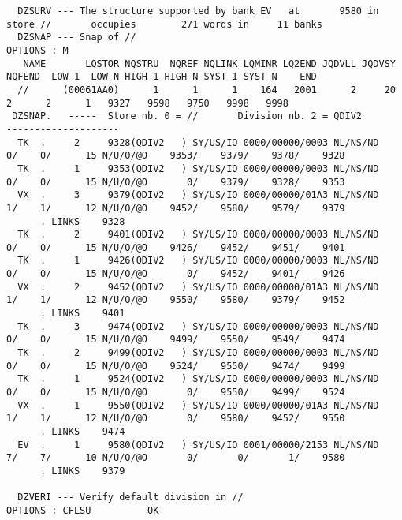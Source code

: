 \begin{Listing}
\begin{verbatim}
  DZSURV --- The structure supported by bank EV   at       9580 in store //       occupies        271 words in     11 banks
  DZSNAP --- Snap of //                                                                              OPTIONS : M
   NAME       LQSTOR NQSTRU  NQREF NQLINK LQMINR LQ2END JQDVLL JQDVSY NQFEND  LOW-1  LOW-N HIGH-1 HIGH-N SYST-1 SYST-N    END
  //      (00061AA0)      1      1      1    164   2001      2     20      2      2      1   9327   9598   9750   9998   9998
 DZSNAP.   -----  Store nb. 0 = //       Division nb. 2 = QDIV2                       --------------------
  TK  .     2     9328(QDIV2   ) SY/US/IO 0000/00000/0003 NL/NS/ND    0/    0/      15 N/U/O/@O    9353/    9379/    9378/    9328
  TK  .     1     9353(QDIV2   ) SY/US/IO 0000/00000/0003 NL/NS/ND    0/    0/      15 N/U/O/@O       0/    9379/    9328/    9353
  VX  .     3     9379(QDIV2   ) SY/US/IO 0000/00000/01A3 NL/NS/ND    1/    1/      12 N/U/O/@O    9452/    9580/    9579/    9379
      . LINKS    9328
  TK  .     2     9401(QDIV2   ) SY/US/IO 0000/00000/0003 NL/NS/ND    0/    0/      15 N/U/O/@O    9426/    9452/    9451/    9401
  TK  .     1     9426(QDIV2   ) SY/US/IO 0000/00000/0003 NL/NS/ND    0/    0/      15 N/U/O/@O       0/    9452/    9401/    9426
  VX  .     2     9452(QDIV2   ) SY/US/IO 0000/00000/01A3 NL/NS/ND    1/    1/      12 N/U/O/@O    9550/    9580/    9379/    9452
      . LINKS    9401
  TK  .     3     9474(QDIV2   ) SY/US/IO 0000/00000/0003 NL/NS/ND    0/    0/      15 N/U/O/@O    9499/    9550/    9549/    9474
  TK  .     2     9499(QDIV2   ) SY/US/IO 0000/00000/0003 NL/NS/ND    0/    0/      15 N/U/O/@O    9524/    9550/    9474/    9499
  TK  .     1     9524(QDIV2   ) SY/US/IO 0000/00000/0003 NL/NS/ND    0/    0/      15 N/U/O/@O       0/    9550/    9499/    9524
  VX  .     1     9550(QDIV2   ) SY/US/IO 0000/00000/01A3 NL/NS/ND    1/    1/      12 N/U/O/@O       0/    9580/    9452/    9550
      . LINKS    9474
  EV  .     1     9580(QDIV2   ) SY/US/IO 0001/00000/2153 NL/NS/ND    7/    7/      10 N/U/O/@O       0/       0/       1/    9580
      . LINKS    9379
 
  DZVERI --- Verify default division in //                                                           OPTIONS : CFLSU          OK
\end{verbatim}\end{Listing}
